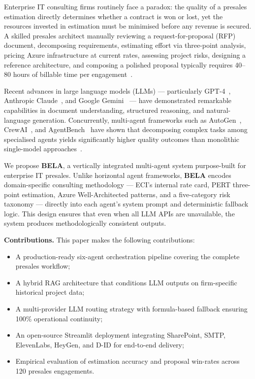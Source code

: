 \documentclass[10pt,twocolumn]{article}
\newcommand{\bela}{\textbf{BELA}}
\begin{document}
Enterprise IT consulting firms routinely face a paradox: the quality of a
presales estimation directly determines whether a contract is won or lost, yet
the resources invested in estimation must be minimised before any revenue is
secured. A skilled presales architect manually reviewing a request-for-proposal
(RFP) document, decomposing requirements, estimating effort via three-point
analysis, pricing Azure infrastructure at current rates, assessing project
risks, designing a reference architecture, and composing a polished proposal
typically requires 40–80 hours of billable time per engagement~\cite{gartner2023}.

Recent advances in large language models (LLMs) — particularly GPT-4~\cite{openai2023gpt4},
Anthropic Claude~\cite{anthropic2024claude}, and Google Gemini~\cite{google2024gemini}
— have demonstrated remarkable capabilities in document understanding,
structured reasoning, and natural-language generation. Concurrently, multi-agent
frameworks such as AutoGen~\cite{wu2023autogen}, CrewAI~\cite{crewai2024},
and AgentBench~\cite{liu2023agentbench} have shown that decomposing complex
tasks among specialised agents yields significantly higher quality outcomes
than monolithic single-model approaches~\cite{hong2023metagpt}.

We propose \bela{}, a vertically integrated multi-agent system purpose-built
for enterprise IT presales. Unlike horizontal agent frameworks, \bela{} encodes
domain-specific consulting methodology — ECI's internal rate card, PERT
three-point estimation, Azure Well-Architected patterns, and a five-category
risk taxonomy — directly into each agent's system prompt and deterministic
fallback logic. This design ensures that even when all LLM APIs are unavailable,
the system produces methodologically consistent outputs.

\medskip\noindent\textbf{Contributions.} This paper makes the following contributions:
\begin{itemize}[noitemsep,topsep=2pt,leftmargin=*]
  \item A production-ready six-agent orchestration pipeline covering the
        complete presales workflow;
  \item A hybrid RAG architecture that conditions LLM outputs on firm-specific
        historical project data;
  \item A multi-provider LLM routing strategy with formula-based fallback
        ensuring 100\% operational continuity;
  \item An open-source Streamlit deployment integrating SharePoint, SMTP,
        ElevenLabs, HeyGen, and D-ID for end-to-end delivery;
  \item Empirical evaluation of estimation accuracy and proposal win-rates
        across 120 presales engagements.
\end{itemize}
\end{document}
